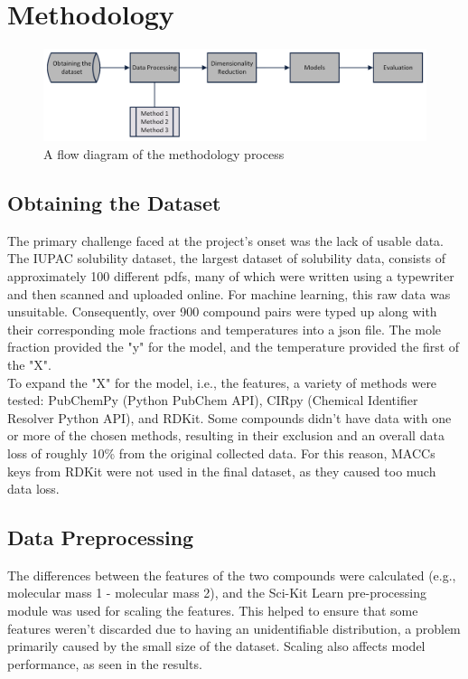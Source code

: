 \documentclass[11pt, titlepage]{article}
\begin{document}
\section{Methodology}
\label{section:methodology}

\begin{figure}[ht]
\centering
\includegraphics[width=15cm]{./media/methodology.png}
\caption{A flow diagram of the methodology process}
\end{figure}

\subsection{Obtaining the Dataset}
The primary challenge faced at the project's onset was the lack of usable data. The IUPAC solubility dataset, the largest dataset of solubility data, consists of approximately 100 different pdfs, many of which were written using a typewriter and then scanned and uploaded online. For machine learning, this raw data was unsuitable. Consequently, over 900 compound pairs were typed up along with their corresponding mole fractions and temperatures into a json file. The mole fraction provided the "y" for the model, and the temperature provided the first of the "X".\\

To expand the "X" for the model, i.e., the features, a variety of methods were tested: PubChemPy\cite{PubChem}\cite{PubChemPy} (Python PubChem API), CIRpy\cite{CIRpy} (Chemical Identifier Resolver Python API), and RDKit\cite{RDKit}. Some compounds didn't have data with one or more of the chosen methods, resulting in their exclusion and an overall data loss of roughly 10\% from the original collected data. For this reason, MACCs keys from RDKit were not used in the final dataset, as they caused too much data loss.

\subsection{Data Preprocessing}
The differences between the features of the two compounds were calculated (e.g., molecular mass 1 - molecular mass 2), and the Sci-Kit Learn\cite{sklearn} pre-processing module was used for scaling the features. This helped to ensure that some features weren't discarded due to having an unidentifiable distribution, a problem primarily caused by the small size of the dataset. Scaling also affects model performance, as seen in the results.\\
\end{document}
